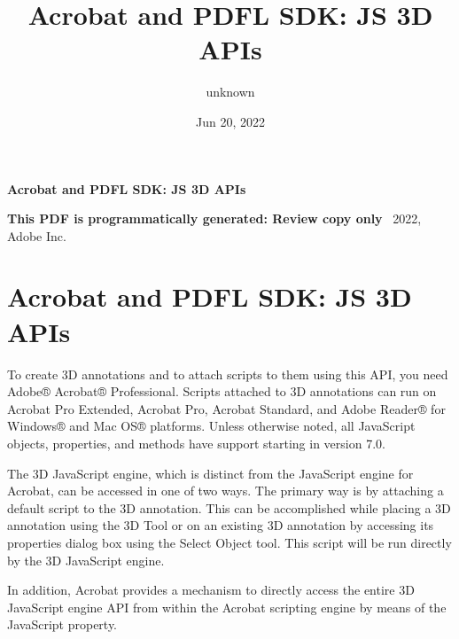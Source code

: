 \documentclass[letterpaper,12pt,english,openany,oneside]{sphinxmanual}
\title{Acrobat and PDFL SDK: JS 3D APIs}
\date{Jun 20, 2022}
\author{unknown}
\begin{document}
\pagestyle{empty}

    \begin{titlepage}
        \begin{figure}[h]
        \end{figure}
        \centering
        \vspace*{40mm}
        \textbf{\Huge Acrobat and PDFL SDK: JS 3D APIs}

        \vspace{15mm}
        \Large \textbf{{This PDF is programmatically generated: Review copy only}}
        \vfill
        \small \textcopyright\ 2022, Adobe Inc.
    \end{titlepage}
    \clearpage
    \tableofcontents
    \clearpage
    
\pagestyle{plain}

\pagestyle{normal}
\label{\detokenize{toc::doc}}



\chapter{Acrobat and PDFL SDK: JS 3D APIs}
\label{\detokenize{index:acrobat-and-pdfl-sdk-js-3d-apis}}\label{\detokenize{index::doc}}
To create 3D annotations and to attach scripts to them using this API, you need Adobe® Acrobat® Professional. Scripts attached to 3D annotations can run on Acrobat Pro Extended, Acrobat Pro, Acrobat Standard, and Adobe Reader® for Windows® and Mac OS® platforms. Unless otherwise noted, all JavaScript objects, properties, and methods have support starting in version 7.0.

The 3D JavaScript engine, which is distinct from the JavaScript engine for Acrobat, can be accessed in one of two ways. The primary way is by attaching a default script to the 3D annotation. This can be accomplished while placing a 3D annotation using the 3D Tool or on an existing 3D annotation by accessing its properties dialog box using the Select Object tool. This script will be run directly by the 3D JavaScript engine.

In addition, Acrobat provides a mechanism to directly access the entire 3D JavaScript engine API from within the Acrobat scripting engine by means of the JavaScript  property.
\end{document}
